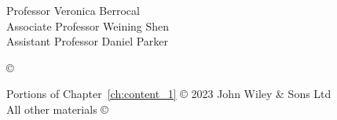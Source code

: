




\othercommitteemembers
{
  Professor Veronica Berrocal\\
  Associate Professor Weining Shen\\
  Assistant Professor Daniel Parker
}


\copyrightdeclaration
{
  {\copyright} {\Degreeyear} \Authorname
}

\prepublishedcopyrightdeclaration
{
Portions of Chapter~\ref{ch:content_1} {\copyright} 2023 John Wiley \& Sons Ltd\\
All other materials {\copyright} {\Degreeyear} \Authorname
}



